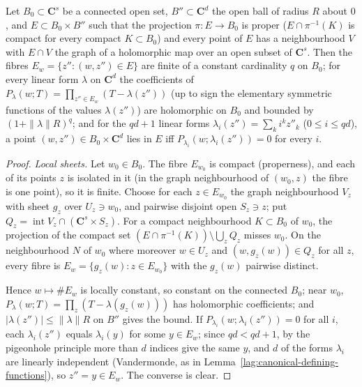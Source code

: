 \begin{lemma}
\label{rem:covering-symmetric-functions}
\leanok
Let \(B_0\subset\mathbf C^s\) be a connected open set, \(B''\subset\mathbf C^{d}\) the open ball of radius \(R\) about \(0\), and \(E\subset B_0\times B''\) such that the
projection \(\pi\colon E\to B_0\) is proper (\(E\cap\pi^{-1}(K)\) is compact for every compact \(K\subset B_0\)) and every point of \(E\) has a neighbourhood \(V\) with
\(E\cap V\) the graph of a holomorphic map over an open subset of \(\mathbf C^s\). Then the fibres \(E_w=\{z'':(w,z'')\in E\}\) are finite of a constant cardinality \(q\) on
\(B_0\); for every linear form \(\lambda\) on \(\mathbf C^{d}\) the coefficients of \(P_\lambda(w;T)=\prod_{z''\in E_w}(T-\lambda(z''))\) (up to sign the elementary symmetric
functions of the values \(\lambda(z'')\)) are holomorphic on \(B_0\) and bounded by \((1+\|\lambda\|R)^q\); and for the \(qd+1\) linear forms
\(\lambda_i(z'')=\sum_ki^kz''_k\) (\(0\le i\le qd\)), a point \((w,z'')\in B_0\times\mathbf C^{d}\) lies in \(E\) iff \(P_{\lambda_i}(w;\lambda_i(z''))=0\) for every \(i\).
\end{lemma}
\begin{proof}
\leanok
\emph{Local sheets.} Let \(w_0\in B_0\). The fibre \(E_{w_0}\) is compact (properness), and each of its points \(z\) is isolated in it (in the graph neighbourhood of
\((w_0,z)\) the fibre is one point), so it is finite. Choose for each \(z\in E_{w_0}\) the graph neighbourhood \(V_z\) with sheet \(g_z\) over \(U_z\ni w_0\), and
pairwise disjoint open \(S_z\ni z\); put \(Q_z=\operatorname{int}V_z\cap(\mathbf C^s\times S_z)\). For a compact neighbourhood \(K\subset B_0\) of \(w_0\), the
projection of the compact set \((E\cap\pi^{-1}(K))\setminus\bigcup_zQ_z\) misses \(w_0\). On the neighbourhood \(N\) of \(w_0\) where moreover \(w\in U_z\) and
\((w,g_z(w))\in Q_z\) for all \(z\), every fibre is \(E_w=\{g_z(w):z\in E_{w_0}\}\) with the \(g_z(w)\) pairwise distinct.

Hence \(w\mapsto\#E_w\) is locally constant, so constant on the connected \(B_0\); near \(w_0\), \(P_\lambda(w;T)=\prod_z(T-\lambda(g_z(w)))\) has holomorphic coefficients;
and \(|\lambda(z'')|\le\|\lambda\|R\) on \(B''\) gives the bound. If \(P_{\lambda_i}(w;\lambda_i(z''))=0\) for all \(i\), each \(\lambda_i(z'')\) equals \(\lambda_i(y)\) for some
\(y\in E_w\); since \(qd<qd+1\), by the pigeonhole principle more than \(d\) indices give the same \(y\), and \(d\) of the forms \(\lambda_i\) are linearly
independent (Vandermonde, as in Lemma~\ref{lag:canonical-defining-functions}), so \(z''=y\in E_w\). The converse is clear.
\end{proof}

